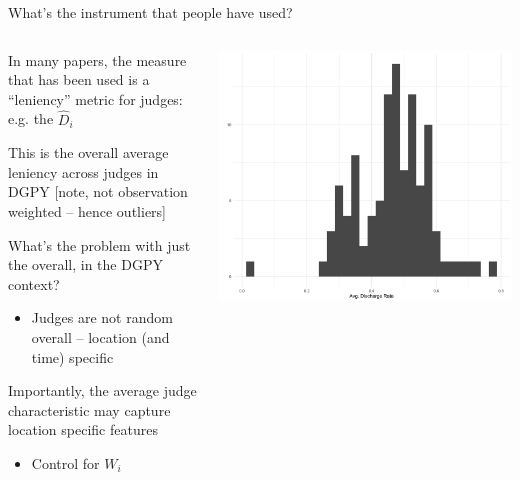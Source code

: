 \documentclass[notes,11pt, aspectratio=169]{beamer}
\newenvironment{wideitemize}{\itemize\addtolength{\itemsep}{10pt}}{\enditemize}
\begin{document}
\begin{frame}{What's the instrument that people have used?}
    \begin{columns}[onlytextwidth, T] %
      \begin{column}{.5\textwidth}
        \begin{wideitemize}
        \item In many papers, the measure that has been used is a
          ``leniency'' metric for judges: e.g. the $\hat{D}_{i}$
        \item This is the overall average leniency across judges in
          DGPY [note, not observation weighted -- hence outliers]
        \item What's the problem with just the overall, in the DGPY
          context?
          \begin{itemize}
          \item Judges are not random overall -- location (and time)
            specific
          \end{itemize}
        \item Importantly, the average judge characteristic may
          capture location specific features
          \begin{itemize}
          \item Control for $W_{i}$
          \end{itemize}
        \end{wideitemize}
      \end{column}%
      \hfill%
      \begin{column}{.5\textwidth}
        \includegraphics[width=\linewidth]{images/leniency_overall.png}
      \end{column}%
    \end{columns}
\end{frame}
\end{document}
